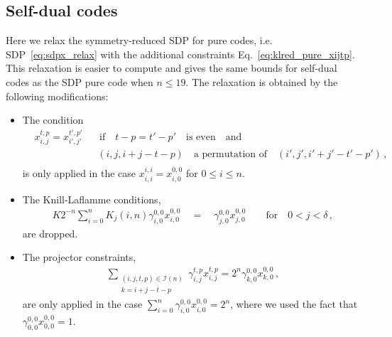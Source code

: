 \documentclass[12pt,a4paper]{amsart}
\newcommand{\II}{\mathcal{I}}
\newcommand{\nn}{\nonumber}
\begin{document}
\subsection{Self-dual codes}\label{app:selfdual}

% 
Here we relax the symmetry-reduced SDP for pure codes, i.e. SDP~\eqref{eq:sdpx_relax} with the additional constraints Eq.~\eqref{eq:klred_pure_xijtp}.
% 
This relaxation is easier to compute and gives the same bounds for self-dual codes as the SDP pure code when $n\leq 19$.
% 
The relaxation is obtained by the following 
modifications:
% 
\begin{itemize}\setlength{\itemsep}{3pt}
    \item[(i)] The condition
    \begin{align}
        &x^{t,p}_{i,j}=x^{t',p'}_{i',j'}\,\,\,\, \quad \text{if} \quad  t-p=t'-p' \quad \text{is even} \quad \text{and} \nn \\
	&\quad\quad\quad\quad\quad\quad\,\, (i,j,i+j-t-p) \quad\text{a permutation of} \quad(i',j',i'+j'-t'-p')\,, \nn \\
    \end{align}
    is only applied in the case 
    $x^{i,i}_{i,i}=x^{0,0}_{i,0}$ for $0\leq i\leq n$.
    \item[(ii)] 
    The Knill-Laflamme conditions,
%
     \begin{align}
            K2^{-n}\sum^n_{i=0} K_j(i,n) \gamma^{0,0}_{i,0} x^{0,0}_{i,0}\quad = \quad \gamma^{0,0}_{j,0} x^{0,0}_{j,0} \quad\quad \text{for} \quad 0<j<\delta \,,
     \end{align}
    are dropped.
    \item[(iii)] The projector constraints,
    \begin{align}
    \sum_{\substack{(i,j,t,p)\in \II(n) \\ k=i+j-t-p}}  \gamma^{t,p}_{i,j} x^{t,p}_{i,j}=2^n \gamma^{0,0}_{k,0} x^{0,0}_{k,0}\,,
    \end{align}
    are only applied in the case $\sum^n_{i=0} \gamma^{0,0}_{i,0} x^{0,0}_{i,0}=2^n$, 
    where we used the fact that $\gamma^{0,0}_{0,0} x^{0,0}_{0,0}=1$.    
\end{itemize}
\end{document}
